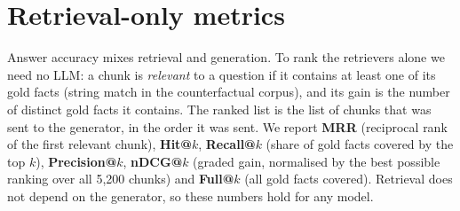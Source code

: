 \documentclass[11pt,a4paper]{article}
\begin{document}
\section{Retrieval-only metrics}
Answer accuracy mixes retrieval and generation. To rank the retrievers alone we need no LLM: a chunk is \emph{relevant} to a question if it contains at least one of its gold facts (string match in the counterfactual corpus), and its gain is the number of distinct gold facts it contains. The ranked list is the list of chunks that was sent to the generator, in the order it was sent. We report \textbf{MRR} (reciprocal rank of the first relevant chunk), \textbf{Hit@$k$}, \textbf{Recall@$k$} (share of gold facts covered by the top $k$), \textbf{Precision@$k$}, \textbf{nDCG@$k$} (graded gain, normalised by the best possible ranking over all 5{,}200 chunks) and \textbf{Full@$k$} (all gold facts covered). Retrieval does not depend on the generator, so these numbers hold for any model.

\begin{table}[h]\centering\footnotesize\setlength{\tabcolsep}{3pt}
\caption{Retrieval quality of the chunks sent to the LLM (24 questions), ranked by nDCG@8. Variants with 3 chunks send fewer than 8, so their @8 values equal their @3 values by construction. $^\dagger$Agentic chunks come from several sub-queries concatenated, so MRR and nDCG are not meaningful for its order; its recall is.}
\end{table}
\end{document}
